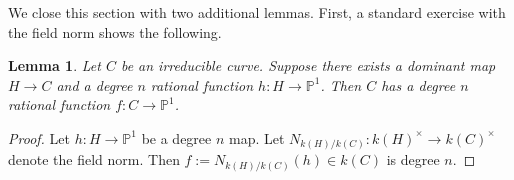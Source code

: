 \documentclass[11pt]{amsart}
\newtheorem{lemma}[theorem]{Lemma}
\theoremstyle{definition}
\numberwithin{equation}{section}
\newcommand{\Pb}{\mathbb{P}}
\begin{document}

We close this section with two additional lemmas.  First, a standard exercise with the field norm shows the following.
\begin{lemma}\label{l:lur}
	Let $C$ be an irreducible curve. Suppose there exists a dominant map $H\to C$ and a degree $n$ rational function $h\colon H\to \Pb^1$. Then $C$ has a degree $n$ rational function $f\colon C\to \Pb^1$.
\end{lemma}
\begin{proof}
	Let $h\colon H\to\Pb^1$ be a degree $n$ map. Let $N_{k(H)/k(C)}\colon k(H)^\times\to k(C)^\times$ denote the field norm.  Then $f:=N_{k(H)/k(C)}(h)\in k(C)$ is degree $n$. 
\end{proof}

\end{document}
